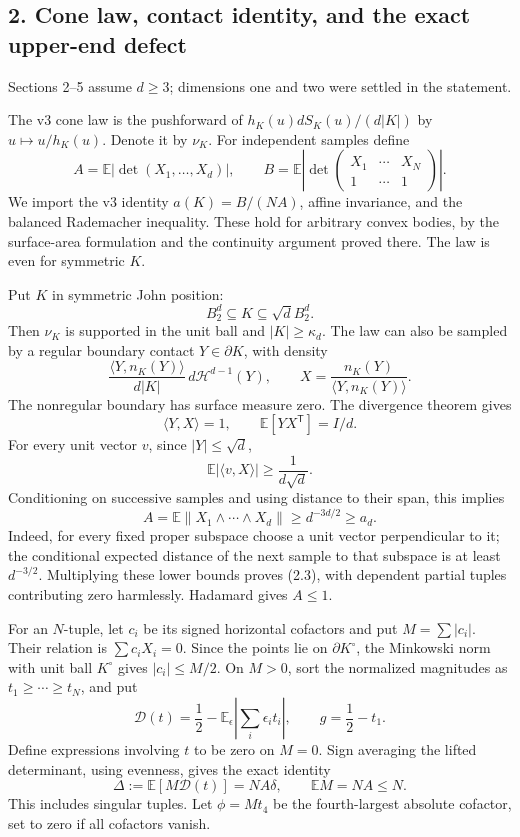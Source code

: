 \documentclass[
  11pt,
]{article}
\begin{document}
\subsection{2. Cone law, contact identity, and the exact upper-end
defect}\label{cone-law-contact-identity-and-the-exact-upper-end-defect}

Sections 2--5 assume \(d\ge3\); dimensions one and two were settled in
the statement.

The v3 cone law is the pushforward of \(h_K(u)dS_K(u)/(d|K|)\) by
\(u\mapsto u/h_K(u)\). Denote it by \(\nu_K\). For independent samples
define \[
 A=\mathbb E|\det(X_1,\ldots,X_d)|,
 \qquad
 B=\mathbb E\left|\det\begin{pmatrix}X_1&\cdots&X_N\\1&\cdots&1\end{pmatrix}\right|.
\] We import the v3 identity \(a(K)=B/(NA)\), affine invariance, and the
balanced Rademacher inequality. These hold for arbitrary convex bodies,
by the surface-area formulation and the continuity argument proved
there. The law is even for symmetric \(K\).

Put \(K\) in symmetric John position: \[
 B_2^d\subseteq K\subseteq\sqrt d B_2^d.                          \tag{2.1}
\] Then \(\nu_K\) is supported in the unit ball and \(|K|\ge\kappa_d\).
The law can also be sampled by a regular boundary contact
\(Y\in\partial K\), with density \[
 \frac{\langle Y,n_K(Y)\rangle}{d|K|}\,d\mathcal H^{d-1}(Y),
 \qquad X=\frac{n_K(Y)}{\langle Y,n_K(Y)\rangle}.
\] The nonregular boundary has surface measure zero. The divergence
theorem gives \[
 \langle Y,X\rangle=1,
 \qquad \mathbb E[Y X^{\mathsf T}]=I/d.                          \tag{2.2}
\] For every unit vector \(v\), since \(|Y|\le\sqrt d\), \[
 \mathbb E|\langle v,X\rangle|\ge\frac1{d\sqrt d}.
\] Conditioning on successive samples and using distance to their span,
this implies \[
 A=\mathbb E\|X_1\wedge\cdots\wedge X_d\|
 \ge d^{-3d/2}\ge a_d.                                         \tag{2.3}
\] Indeed, for every fixed proper subspace choose a unit vector
perpendicular to it; the conditional expected distance of the next
sample to that subspace is at least \(d^{-3/2}\). Multiplying these
lower bounds proves (2.3), with dependent partial tuples contributing
zero harmlessly. Hadamard gives \(A\le1\).

For an \(N\)-tuple, let \(c_i\) be its signed horizontal cofactors and
put \(M=\sum|c_i|\). Their relation is \(\sum c_iX_i=0\). Since the
points lie on \(\partial K^\circ\), the Minkowski norm with unit ball
\(K^\circ\) gives \(|c_i|\le M/2\). On \(M>0\), sort the normalized
magnitudes as \(t_1\ge\cdots\ge t_N\), and put \[
 \mathscr D(t)=\frac12-
        \mathbb E_\epsilon\left|\sum_i\epsilon_i t_i\right|,
 \qquad g=\frac12-t_1.
\] Define expressions involving \(t\) to be zero on \(M=0\). Sign
averaging the lifted determinant, using evenness, gives the exact
identity \[
 \Delta:=\mathbb E[M\mathscr D(t)]=NA\delta,
 \qquad \mathbb E M=NA\le N.                                   \tag{2.4}
\] This includes singular tuples. Let \(\phi=Mt_4\) be the
fourth-largest absolute cofactor, set to zero if all cofactors vanish.
\end{document}
